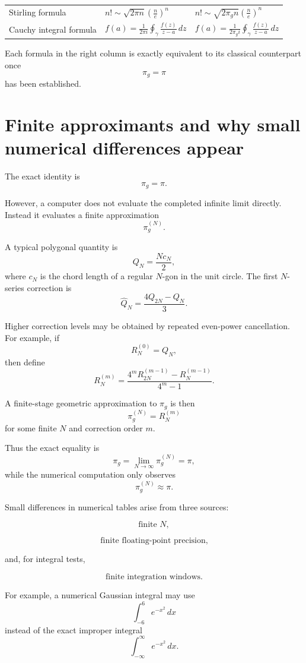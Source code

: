 \documentclass[11pt]{article}
\begin{document}
\begin{center}
\begin{longtable}{>{\raggedright\arraybackslash}p{}
                  >{\centering\arraybackslash}p{}
                  >{\centering\arraybackslash}p{}}
Stirling formula
& \(\displaystyle n!\sim \sqrt{2\pi n}\left(\frac ne\right)^n\)
& \(\displaystyle n!\sim \sqrt{2\pi_g n}\left(\frac ne\right)^n\) \\

Cauchy integral formula
& \(\displaystyle f(a)=\frac{1}{2\pi i}\oint_{\gamma}\frac{f(z)}{z-a}\,dz\)
& \(\displaystyle f(a)=\frac{1}{2\pi_g i}\oint_{\gamma}\frac{f(z)}{z-a}\,dz\) \\
\end{longtable}
\end{center}

Each formula in the right column is exactly equivalent to its classical
counterpart once
\[
\pi_g=\pi
\]
has been established.

\section{Finite approximants and why small numerical differences appear}

The exact identity is
\[
\pi_g=\pi.
\]

However, a computer does not evaluate the completed infinite limit directly.
Instead it evaluates a finite approximation
\[
\pi_g^{(N)}.
\]

A typical polygonal quantity is
\[
Q_N=\frac{Nc_N}{2},
\]
where \(c_N\) is the chord length of a regular \(N\)-gon in the unit circle.
The first \(N\)-series correction is
\[
\widehat Q_N
=
\frac{4Q_{2N}-Q_N}{3}.
\]

Higher correction levels may be obtained by repeated even-power cancellation.
For example, if
\[
R_N^{(0)}=Q_N,
\]
then define
\[
R_N^{(m)}
=
\frac{4^m R_{2N}^{(m-1)}-R_N^{(m-1)}}{4^m-1}.
\]

A finite-stage geometric approximation to \(\pi_g\) is then
\[
\pi_g^{(N)}=R_N^{(m)}
\]
for some finite \(N\) and correction order \(m\).

Thus the exact equality is
\[
\pi_g
=
\lim_{N\to\infty}\pi_g^{(N)}
=
\pi,
\]
while the numerical computation only observes
\[
\pi_g^{(N)}\approx \pi.
\]

Small differences in numerical tables arise from three sources:

\[
\text{finite }N,
\]

\[
\text{finite floating-point precision,}
\]

and, for integral tests,

\[
\text{finite integration windows.}
\]

For example, a numerical Gaussian integral may use
\[
\int_{-6}^{6}e^{-x^2}\,dx
\]
instead of the exact improper integral
\[
\int_{-\infty}^{\infty}e^{-x^2}\,dx.
\]
\end{document}
